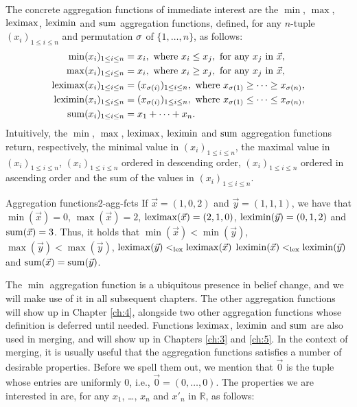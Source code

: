 The concrete aggregation functions of immediate interest are the
$\min$, $\max$, ${\operatorname{leximax}}$, ${\operatorname{leximin}}$ and ${\operatorname{sum}}$ aggregation functions,
defined, for any $n$-tuple $(x_i)_{1\le i \le n}$ and 
permutation $\sigma$ of $\{1,\dots, n\}$, as follows:
\begin{align*}
	{\operatorname{min}}(x_i)_{1\le i \le n} &= x_i,~\text{where}~x_i\le x_j,~\text{for any}~x_j~\text{in}~\vec{x},\\
	{\operatorname{max}}(x_i)_{1\le i \le n} &= x_i,~\text{where}~x_i\ge x_j,~\text{for any}~x_j~\text{in}~\vec{x},\\
	{\operatorname{leximax}}(x_i)_{1\le i \le n} &= (x_{\sigma(i)})_{1\le i \le n},~\text{where}~x_{\sigma(1)}\ge\dots\ge x_{\sigma(n)},\\
	{\operatorname{leximin}}(x_i)_{1\le i \le n} &= (x_{\sigma(i)})_{1\le i \le n},~\text{where}~x_{\sigma(1)}\le\dots\le x_{\sigma(n)},\\
	{\operatorname{sum}}(x_i)_{1\le i \le n} &= x_1+\dots + x_n.
\end{align*}
Intuitively, the $\min$, $\max$, ${\operatorname{leximax}}$, ${\operatorname{leximin}}$ and ${\operatorname{sum}}$ aggregation functions
return, respectively,
the minimal value in $(x_i)_{1\le i \le n}$,
the maximal value in $(x_i)_{1\le i \le n}$,
$(x_i)_{1\le i \le n}$ ordered in descending order,
$(x_i)_{1\le i \le n}$ ordered in ascending order
and the sum of the values in $(x_i)_{1\le i \le n}$.

\begin{xmpl}{Aggregation functions}{2-agg-fcts}
	If $\vec{x}=(1,0,2)$ and $\vec{y}=(1,1,1)$,
	we have that
	$\min(\vec{x})=0$,
	$\max(\vec{x})=2$,
	${\operatorname{leximax}}(\vec{x})=(2,1,0)$,
	${\operatorname{leximin}}(\vec{y})=(0,1,2)$
	and 
	${\operatorname{sum}}(\vec{x})=3$.
	Thus, it holds that 
	$\min(\vec{x})<\min(\vec{y})$,
	$\max(\vec{y})<\max(\vec{y})$,
	${\operatorname{leximax}}(\vec{y})<_{\operatorname{lex}}{\operatorname{leximax}}(\vec{x})$
	${\operatorname{leximin}}(\vec{x})<_{\operatorname{lex}}{\operatorname{leximin}}(\vec{y})$
	and 
	${\operatorname{sum}}(\vec{x})={\operatorname{sum}}(\vec{y})$.
\end{xmpl}


The $\min$ aggregation function is a 
ubiquitous presence in belief change, and we will
make use of it in all subsequent chapters. 
The other aggregation functions will show up
in Chapter \ref{ch:4}, alongside two other 
aggregation functions whose definition is deferred 
until needed.
Functions ${\operatorname{leximax}}$, ${\operatorname{leximin}}$ and ${\operatorname{sum}}$ 
are also used in merging, and will show up 
in Chapters \ref{ch:3} and \ref{ch:5}.
In the context of merging, 
it is usually useful that the aggregation functions satisfies
a number of desirable properties.
Before we spell them out, we mention that $\vec{0}$ is the tuple whose entries are 
uniformly $0$, i.e., $\vec{0} = (0,\dots,0)$.
The properties we are interested in are,
for any $x_1$, \dots, $x_n$ and $x'_n$ in $\mathbb{R}$,
as follows:

